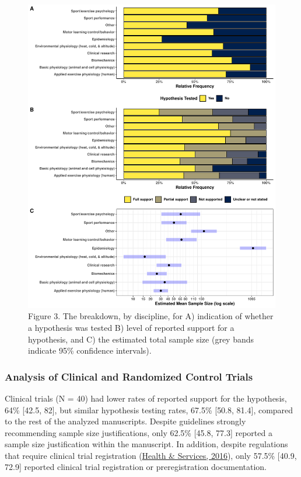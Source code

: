 \documentclass[]{cik}%
\begin{document}
\begin{figure}[H]
\includegraphics[width=1\linewidth]{figure3} \caption{Figure 3. The breakdown, by discipline, for A) indication of whether a hypothesis was tested B) level of reported support for a hypothesis,  and C) the estimated total sample size (grey bands indicate 95\% confidence intervals).}\label{fig:fig3}
\end{figure}

\newpage

\hypertarget{analysis-of-clinical-and-randomized-control-trials}{%
\subsubsection{Analysis of Clinical and Randomized Control
Trials}\label{analysis-of-clinical-and-randomized-control-trials}}

Clinical trials (N = 40) had lower rates of reported support for the
hypothesis, 64\% {[}42.5, 82{]}, but similar hypothesis testing rates,
67.5\% {[}50.8, 81.4{]}, compared to the rest of the analyzed
manuscripts. Despite guidelines strongly recommending sample size
justifications, only 62.5\% {[}45.8, 77.3{]} reported a sample size
justification within the manuscript. In addition, despite regulations
that require clinical trial registration
(\protect\hyperlink{ref-clinreg2016}{Health \& Services, 2016}), only
57.5\% {[}40.9, 72.9{]} reported clinical trial registration or
preregistration documentation.
\end{document}
